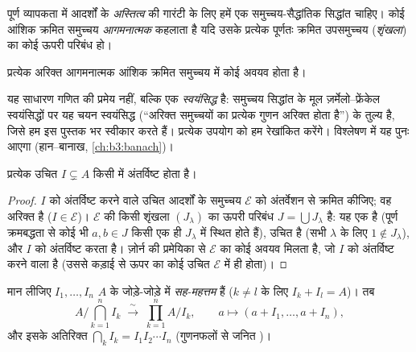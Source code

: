 पूर्ण व्यापकता में  आदर्शों के \emph{अस्तित्व} की गारंटी के
लिए हमें एक समुच्चय-सैद्धांतिक सिद्धांत चाहिए। कोई आंशिक क्रमित
समुच्चय \emph{आगमनात्मक} कहलाता है यदि उसके प्रत्येक पूर्णतः
क्रमित उपसमुच्चय (\emph{शृंखला}) का कोई ऊपरी परिबंध हो।

\begin{theorem}[ज़ोर्न की प्रमेयिका]\label{thm:b3:rings:zorn}
प्रत्येक अरिक्त आगमनात्मक आंशिक क्रमित समुच्चय में कोई 
अवयव होता है।
\admitted
\end{theorem}

\begin{remark}\label{rem:b3:rings:zorn}
यह साधारण गणित की प्रमेय नहीं, बल्कि एक \emph{स्वयंसिद्ध} है:
समुच्चय सिद्धांत के मूल ज़र्मेलो--फ्रेंकेल स्वयंसिद्धों पर यह
चयन स्वयंसिद्ध (``अरिक्त समुच्चयों का प्रत्येक गुणन अरिक्त होता
है'') के तुल्य है, जिसे हम इस पुस्तक भर स्वीकार करते हैं।
प्रत्येक उपयोग को हम रेखांकित करेंगे। विश्लेषण में यह पुनः आएगा
(हान--बानाख, \cref{ch:b3:banach})।
\end{remark}

\begin{theorem}[क्रुल]\label{thm:b3:rings:krull}
प्रत्येक उचित  $I \subsetneq A$ किसी  में अंतर्विष्ट
होता है।
\end{theorem}

\begin{proof}
$I$ को अंतर्विष्ट करने वाले उचित आदर्शों के समुच्चय $\mathcal E$ को
अंतर्वेशन से क्रमित कीजिए; वह अरिक्त है ($I \in \mathcal E$)। $\mathcal E$ की किसी
शृंखला $(J_\lambda)$ का ऊपरी परिबंध $J = \bigcup
J_\lambda$ है: यह एक  है (पूर्ण
क्रमबद्धता से कोई भी $a, b \in J$ किसी एक ही $J_\lambda$ में स्थित होते हैं),
उचित है (सभी $\lambda$ के लिए $1 \notin J_\lambda$), और $I$ को अंतर्विष्ट करता
है। ज़ोर्न की प्रमेयिका से $\mathcal
E$ का कोई  अवयव मिलता है, जो
$I$ को अंतर्विष्ट करने वाला  है (उससे कड़ाई से
ऊपर का कोई उचित  $\mathcal E$ में ही होता)।
\end{proof}

\begin{theorem}[चीनी शेषफल प्रमेय]\label{thm:b3:rings:crt}
मान लीजिए $I_1, \dots, I_n$ $A$ के जोड़े-जोड़े में
\emph{सह-महत्तम}  हैं ($k \neq l$ के लिए
$I_k + I_l = A$)। तब
\[
A\Big/\bigcap_{k=1}^n I_k \;\xrightarrow{\;\sim\;}\;
\prod_{k=1}^n A/I_k,
\qquad
a \longmapsto (a + I_1, \dots, a + I_n),
\]
और इसके अतिरिक्त $\bigcap_k I_k = I_1 I_2 \cdots I_n$ (गुणनफलों से जनित
)।
\end{theorem}

